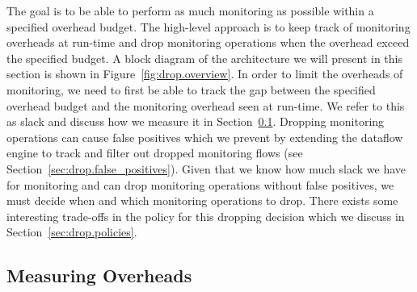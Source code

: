 The goal is to be able to perform as much monitoring as possible within a specified overhead budget.
The high-level approach is to keep track of monitoring overheads at run-time
and drop monitoring operations when the overhead exceed the specified budget.
A block diagram of the architecture we will present in this section is shown in
Figure~\ref{fig:drop.overview}.  In order to limit the overheads of
monitoring, we need to first be able to track the gap between the specified
overhead budget and the monitoring overhead seen at run-time. We refer to this
as slack and discuss how we measure it in Section~\ref{sec:drop.slack}. 
Dropping monitoring operations can cause false positives which we prevent by
extending the dataflow engine to track and filter out dropped monitoring flows (see
Section~\ref{sec:drop.false_positives}).
Given that we know how much slack we have for monitoring and can drop
monitoring operations without false positives, we must decide when and which
monitoring operations to drop.  There exists some interesting trade-offs in the
policy for this dropping decision which we discuss in
Section~\ref{sec:drop.policies}.

\subsection{Measuring Overheads}
\label{sec:drop.slack}

